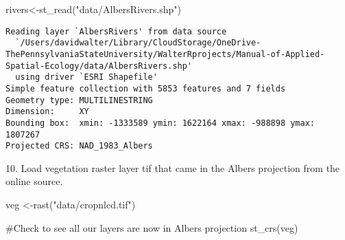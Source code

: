 \documentclass[
  letterpaper,
]{book}
\newenvironment{Shaded}{\begin{snugshade}}{\end{snugshade}}
\newcommand{\CommentTok}[1]{\textcolor[rgb]{0.37,0.37,0.37}{#1}}
\newcommand{\FunctionTok}[1]{\textcolor[rgb]{0.28,0.35,0.67}{#1}}
\newcommand{\NormalTok}[1]{\textcolor[rgb]{0.00,0.23,0.31}{#1}}
\newcommand{\OtherTok}[1]{\textcolor[rgb]{0.00,0.23,0.31}{#1}}
\newcommand{\StringTok}[1]{\textcolor[rgb]{0.13,0.47,0.30}{#1}}
\begin{document}
\begin{Shaded}
\begin{Highlighting}[]
\NormalTok{rivers}\OtherTok{\textless{}{-}}\FunctionTok{st\_read}\NormalTok{(}\StringTok{"data/AlbersRivers.shp"}\NormalTok{)}
\end{Highlighting}
\end{Shaded}

\begin{verbatim}
Reading layer `AlbersRivers' from data source 
  `/Users/davidwalter/Library/CloudStorage/OneDrive-ThePennsylvaniaStateUniversity/WalterRprojects/Manual-of-Applied-Spatial-Ecology/data/AlbersRivers.shp' 
  using driver `ESRI Shapefile'
Simple feature collection with 5853 features and 7 fields
Geometry type: MULTILINESTRING
Dimension:     XY
Bounding box:  xmin: -1333589 ymin: 1622164 xmax: -988898 ymax: 1807267
Projected CRS: NAD_1983_Albers
\end{verbatim}

10. Load vegetation raster layer tif that came in the Albers projection
from the online source.

\begin{Shaded}
\begin{Highlighting}[]
\NormalTok{veg }\OtherTok{\textless{}{-}}\FunctionTok{rast}\NormalTok{(}\StringTok{"data/cropnlcd.tif"}\NormalTok{)}
\end{Highlighting}
\end{Shaded}

\begin{Shaded}
\begin{Highlighting}[]
\CommentTok{\#Check to see all our layers are now in Albers projection}
\FunctionTok{st\_crs}\NormalTok{(veg)}
\end{Highlighting}
\end{Shaded}
\end{document}
